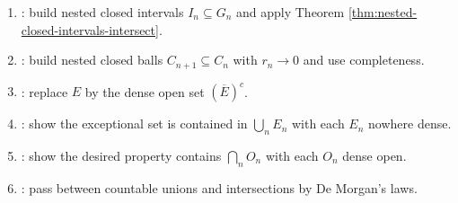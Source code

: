 \begin{method} \label{meth:baire-category-proof-patterns} 
\begin{enumerate}[label=(\roman*)]
\setlength{\itemsep}{0pt}
\item {}: build nested closed intervals $I_n\subseteq G_n$ and apply Theorem \ref{thm:nested-closed-intervals-intersect}.
\item {}: build nested closed balls $C_{n+1}\subseteq C_n$ with $r_n\to0$ and use completeness.
\item {}: replace $E$ by the dense open set $(\overline{E})^c$.
\item {}: show the exceptional set is contained in $\bigcup_n E_n$ with each $E_n$ nowhere dense.
\item {}: show the desired property contains $\bigcap_n O_n$ with each $O_n$ dense open.
\item {}: pass between countable unions and intersections by De Morgan's laws.
\end{enumerate}
\end{method}

